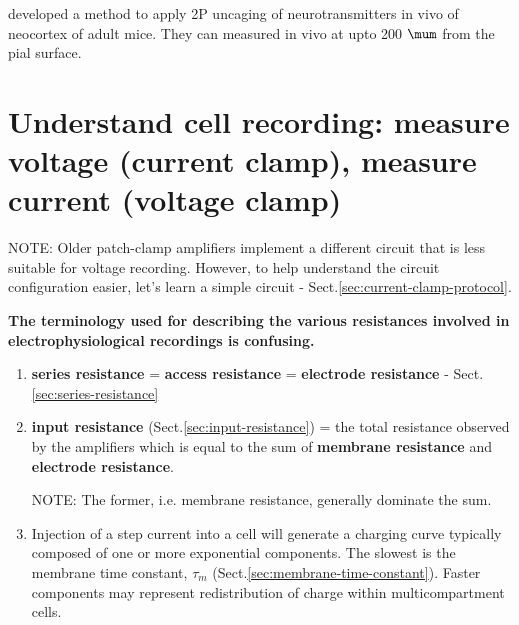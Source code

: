 \citep{noguchi2011} developed a method to apply 2P uncaging of neurotransmitters in vivo of
neocortex of adult mice. They can measured in vivo at upto 200 $\mum$ from the
pial surface.

\section{Understand cell recording: measure voltage (current clamp), measure
current (voltage clamp)}
\label{sec:understand-cell-ephys-recording}

NOTE: Older patch-clamp amplifiers implement a different circuit that is less
suitable for voltage recording. However, to help understand the circuit
configuration easier, let's learn a simple circuit -
Sect.\ref{sec:current-clamp-protocol}.

{\bf The terminology used for describing the various resistances involved in
electrophysiological recordings is confusing.}
\begin{enumerate}
  \item {\bf series resistance} = {\bf access resistance} = {\bf electrode
  resistance} - Sect.\ref{sec:series-resistance}

  \item {\bf input resistance} (Sect.\ref{sec:input-resistance}) = the total
  resistance observed by the amplifiers which is equal to the sum of {\bf
  membrane resistance} and {\bf electrode resistance}.

NOTE: The former, i.e. membrane resistance, generally dominate the sum.

  \item Injection of a step current into a cell will generate a charging curve
  typically composed of one or more exponential components. The slowest is the
  membrane time constant, $\tau_m$
  (Sect.\ref{sec:membrane-time-constant}).
  Faster components may represent redistribution of charge within
  multicompartment cells.

\end{enumerate}


